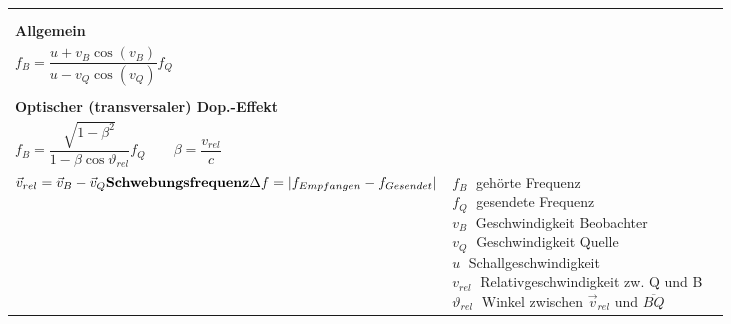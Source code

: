 \begin{tabular}{|l|l|l|}
\begin{minipage}[]{7cm}
	  	$f_B = \left(1 + \dfrac{v_B}{u} \cos(\vartheta_B)\right) f_Q$ \\
	  	\vspace{.5cm}\\
	  	\textbf{Allgemein} \\
	  	$f_B = \dfrac{u + v_B \cos(v_B)}{u - v_Q \cos(v_Q)} f_Q$ \\
	  	\vspace{.5cm}\\
	  	\textbf{Optischer (transversaler) Dop.-Effekt } \\
	  	$f_B = \dfrac{\sqrt{1 - \beta^2}}{1 - \beta \cos \vartheta_{rel}} f_Q \qquad \beta =
	  	\dfrac{v_{rel}}{c}$ \\ 
	  	$ \vec{v}_{rel} = \vec{v}_B - \vec{v}_Q \vspace{.5cm}\\
	  	\textbf{Schwebungsfrequenz}\\
	  	\Delta f = |f_{Empfangen} - f_{Gesendet}|$ \vspace{.2cm}
      	\renewcommand{\arraystretch}{1}
    	\end{minipage}
	& \parbox{6.5cm}{
		$f_B \;$ gehörte Frequenz \\
		$f_Q \;$ gesendete Frequenz \\
		$v_B \;$ Geschwindigkeit Beobachter \\
		$v_Q \;$ Geschwindigkeit Quelle\\
		$u \;$ Schallgeschwindigkeit\\
		$v_{rel} \;$ Relativgeschwindigkeit zw. Q und B\\
		$\vartheta_{rel} \;$ Winkel zwischen $\vec{v}_{rel}$ und $\overline{BQ}$
		} \\
\hline
\end{tabular}

